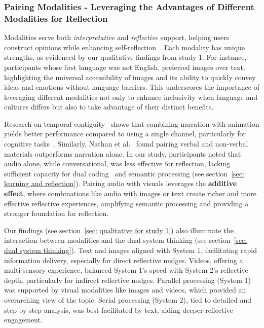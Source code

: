 \subsubsection{Pairing Modalities - Leveraging the Advantages of Different Modalities for Reflection}
Modalities serve both \textit{interpretative} and \textit{reflective} support, helping users construct opinions while enhancing self-reflection~\cite{reid2003supporting}. Each modality has unique strengths, as evidenced by our qualitative findings from study 1. For instance, participants whose first language was not English, preferred images over text, highlighting the universal accessibility of images and its ability to quickly convey ideas and emotions without language barriers. This underscores the importance of leveraging different modalities not only to enhance inclusivity when language and cultures differs but also to take advantage of their distinct benefits.

Research on temporal contiguity~\cite{moreno1999cognitive} shows that combining narration with animation yields better performance compared to using a single channel, particularly for cognitive tasks~\cite{lee1997effect, paivio2013imagery}. Similarly, Nathan et al.~\cite{nathan1992theory} found pairing verbal and non-verbal materials outperforms narration alone. In our study, participants noted that audio alone, while conversational, was less effective for reflection, lacking sufficient capacity for dual coding~\cite{paivio1975free} and semantic processing (see section~\ref{sec: learning and reflection}). Pairing audio with visuals leverages the \textbf{additive effect}, where combinations like audio with images or text create richer and more effective reflective experiences, amplifying semantic processing and providing a stronger foundation for reflection.

Our findings (see section~\ref{sec: qualitative for study 1}) also illuminate the interaction between modalities and the dual-system thinking (see section~\ref{sec: dual system thinking}). Text and images aligned with System 1, facilitating rapid information delivery, especially for direct reflective nudges. Videos, offering a multi-sensory experience, balanced System 1’s speed with System 2’s reflective depth, particularly for indirect reflective nudges. Parallel processing (System 1) was supported by visual modalities like images and videos, which provided an overarching view of the topic. Serial processing (System 2), tied to detailed and step-by-step analysis, was best facilitated by text, aiding deeper reflective engagement.

